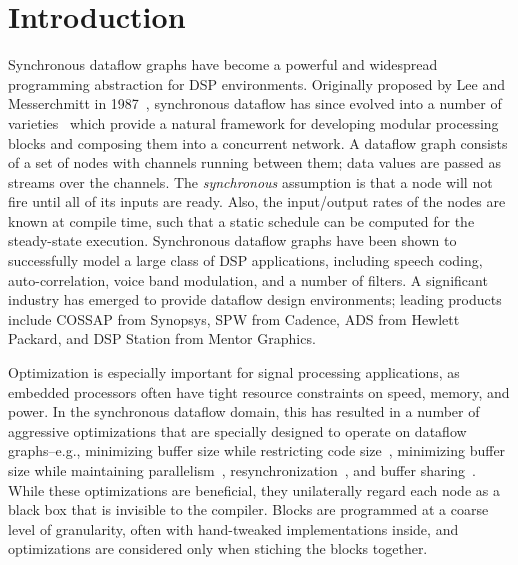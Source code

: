 \section{Introduction}

Synchronous dataflow graphs have become a powerful and widespread
programming abstraction for DSP environments.  Originally proposed by
Lee and Messerchmitt in 1987~\cite{LM87-i}, synchronous dataflow has
since evolved into a number of
varieties~\cite{BELP96,Bhatt00,Murthy2002,Buck93} which provide a
natural framework for developing modular processing blocks and
composing them into a concurrent network.  A dataflow graph consists
of a set of nodes with channels running between them; data values are
passed as streams over the channels.  The {\it synchronous} assumption
is that a node will not fire until all of its inputs are ready.  Also,
the input/output rates of the nodes are known at compile time, such
that a static schedule can be computed for the steady-state execution.
Synchronous dataflow graphs have been shown to successfully model a
large class of DSP applications, including speech coding,
auto-correlation, voice band modulation, and a number of filters.  A
significant industry has emerged to provide dataflow design
environments; leading products include COSSAP from Synopsys, SPW from
Cadence, ADS from Hewlett Packard, and DSP Station from Mentor
Graphics.

Optimization is especially important for signal processing
applications, as embedded processors often have tight resource
constraints on speed, memory, and power.  In the synchronous dataflow
domain, this has resulted in a number of aggressive optimizations that
are specially designed to operate on dataflow graphs--e.g., minimizing
buffer size while restricting code size~\cite{murt1997x1}, minimizing
buffer size while maintaining parallelism~\cite{GGD94},
resynchronization~\cite{Bhatta2000}, and buffer
sharing~\cite{murt2001x1}.  While these optimizations are beneficial,
they unilaterally regard each node as a black box that is invisible to
the compiler.  Blocks are programmed at a coarse level of granularity,
often with hand-tweaked implementations inside, and optimizations are
considered only when stiching the blocks together.

